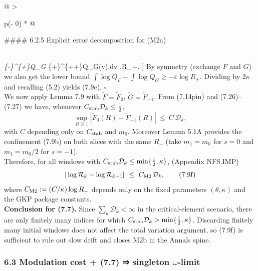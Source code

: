 \documentclass[
  11pt,
]{article}
\begin{document}
\begin{longtable}[]{@{}
  >{\raggedright\arraybackslash}p{(\columnwidth - 0\tabcolsep) * }@{}}
\toprule
\begin{minipage}[b]{\linewidth}\raggedright
\#\#\#\# 6.2.5 Explicit error decomposition for (M2a)
\end{minipage} \\
\midrule
\endhead
\int\emph{\{\theta-\kappa\}\^{}\{\theta+\kappa\}\log Q\_G \le \int}\{\theta+\kappa\}\^{}\{\theta+\kappa+\varepsilon\}\log Q\_G(v),dv \le \varepsilon,\log R\_+. {]} By symmetry (exchange \(F\) and \(G\)) we also get the lower bound \(\int\log Q_F-\int\log Q_G\ge -\varepsilon\log R_+\). Dividing by \(2\kappa\) and recalling (5.2) yields (7.9c). \(\square\) \\
We now apply Lemma 7.9 with \(\widetilde F=\widetilde F_0\), \(\widetilde G=\widetilde F_{-1}\). From (7.14pin) and (7.26)--(7.27) we have, whenever \(C_{\rm stab}\mathcal D_k\le \tfrac12\), \\
\begin{equation}
\sup_{R\ge 1}|\widetilde F_0(R)-\widetilde F_{-1}(R)|
\ \le\
C\,\mathcal D_k,
\tag{7.9e}
\end{equation}
with \(C\) depending only on \(C_{\rm stab}\) and \(m_0\). Moreover Lemma 5.1A provides the confinement (7.9b) on both slices with the same \(R_+\) (take \(m_1=m_0\) for \(s=0\) and \(m_1=m_0/2\) for \(s=-1\)). \\
Therefore, for all windows with \(C_{\rm stab}\mathcal D_k\le \min\{\tfrac12,\kappa\}\), (Appendix NFS.IMP) \\
\begin{equation}
|\log \mathcal R_k-\log \mathcal R_{k-1}|
\ \le\
C_{\rm M2}\,\mathcal D_k,
\tag{7.9f}
\end{equation}
where \(C_{\rm M2}:=(C/\kappa)\log R_+\) depends only on the fixed parameters \((\theta,\kappa)\) and the GKP package constants. \\
\textbf{Conclusion for (7.7).} Since \(\sum_k\mathcal D_k<\infty\) in the critical-element scenario, there are only finitely many indices for which \(C_{\rm stab}\mathcal D_k>\min\{\tfrac12,\kappa\}\). Discarding finitely many initial windows does not affect the total variation argument, so (7.9f) is sufficient to rule out slow drift and closes M2b in the Annals spine. \\
\bottomrule
\end{longtable}

\hypertarget{modulation-cost-7.7-singleton-omega-limit}{%
\subsubsection{\texorpdfstring{6.3 Modulation cost + (7.7) ⇒ singleton \(\omega\)-limit}{6.3 Modulation cost + (7.7) ⇒ singleton \textbackslash omega-limit}}\label{modulation-cost-7.7-singleton-omega-limit}}
\end{document}

